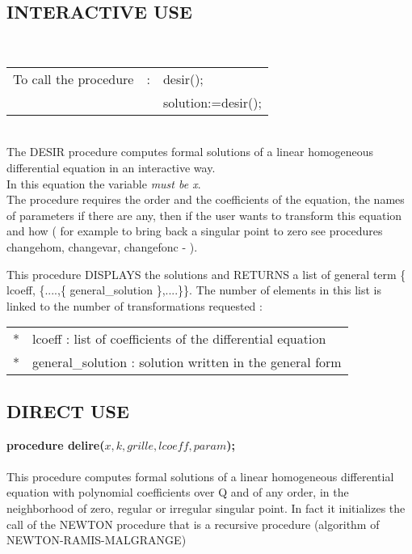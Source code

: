 \subsection{INTERACTIVE USE}
\ \\
\begin{tabular}{lcl}
To call the procedure & : & desir(); \\
                      &   & solution:=desir(); \\
\end{tabular}
\ \\
The DESIR procedure computes formal solutions of a linear homogeneous
differential equation in an interactive way. \\
In this equation the variable \emph{must be x}. \\

The procedure requires the order and the coefficients of the equation, the
names of parameters if there are any, then if the user wants to transform
this equation and how ( for example to bring back a singular point to zero
see procedures changehom, changevar, changefonc - ). \par
This procedure DISPLAYS the solutions and RETURNS a list of general term
\{ lcoeff, \{....,\{ general\_solution \},....\}\}. The number of elements in
this list is linked to the number of transformations requested : \\
\begin{tabular}{rl}
{*} & lcoeff : list of coefficients of the differential equation \\
{*} & general\_solution : solution written in the general form \\
\end{tabular}

\subsection{DIRECT USE}

{\bf procedure delire($x,k,grille,lcoeff,param$);} \\
\ \\
This procedure computes formal solutions of a linear homogeneous differential 
equation with polynomial coefficients over Q and of any order, in the
neighborhood of zero, regular or irregular singular point. In fact it
initializes the call of the NEWTON procedure that is a recursive procedure
(algorithm of NEWTON-RAMIS-MALGRANGE)

